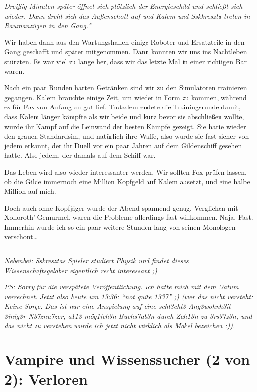 \documentclass[11pt]{article}
\begin{document}
\emph{Dreißig Minuten später öffnet sich plötzlich der Energieschild und
schließt sich wieder. Dann dreht sich das Außenschott auf und Kalem und
Sskkreszta treten in Raumanzügen in den Gang.°}

Wir haben dann aus den Wartungshallen einige Roboter und Ersatzteile in
den Gang geschafft und später mitgenommen. Dann konnten wir uns ins
Nachtleben stürzten. Es war viel zu lange her, dass wir das letzte Mal
in einer richtigen Bar waren.

Nach ein paar Runden harten Getränken sind wir zu den Simulatoren
trainieren gegangen. Kalem brauchte einige Zeit, um wieder in Form zu
kommen, während es für Fox von Anfang an gut lief. Trotzdem endete die
Trainingsrunde damit, dass Kalem länger kämpfte als wir beide und kurz
bevor sie abschließen wollte, wurde ihr Kampf auf die Leinwand der
besten Kämpfe gezeigt. Sie hatte wieder den grauen Standardsim, und
natürlich ihre Waffe, also wurde sie fast sicher von jedem erkannt, der
ihr Duell vor ein paar Jahren auf dem Gildenschiff gesehen hatte. Also
jedem, der damals auf dem Schiff war.

Das Leben wird also wieder interessanter werden. Wir sollten Fox prüfen
lassen, ob die Gilde immernoch eine Million Kopfgeld auf Kalem ausetzt,
und eine halbe Million auf mich.

Doch auch ohne Kopfjäger wurde der Abend spannend genug. Verglichen mit
Xolloroth' Gemurmel, waren die Probleme allerdings fast willkommen.
Naja. Fast. Immerhin wurde ich so ein paar weitere Stunden lang von
seinen Monologen verschont\ldots{}

\begin{center}\rule{3in}{0.4pt}\end{center}

\emph{Nebenbei: Sskresztas Spieler studiert Physik und findet dieses
Wissenschaftsgelaber eigentlich recht interessant ;)}

\emph{PS: Sorry für die verspätete Veröffentlichung. Ich hatte mich mit
dem Datum verrechnet. Jetzt also heute um 13:36: ``not quite 1337'' ;)
(wer das nicht versteht: Keine Sorge. Das ist nur eine Anspielung auf
eine schl3cht3 Ang3wohnh3it 3inig3r N37znu7zer, a113 mög1ich3n
Buchs7ab3n durch Zah13n zu 3rs37z3n, und das nicht zu verstehen wurde
ich jetzt nicht wirklich als Makel bezeichen :)).}

\section{Vampire und Wissenssucher (2 von 2): Verloren}
\end{document}
